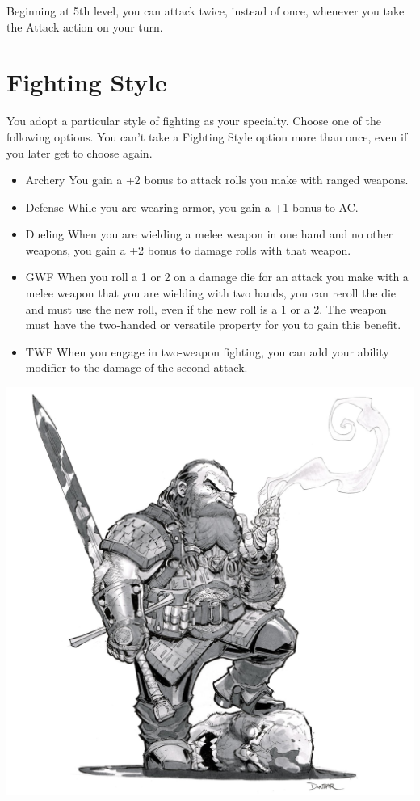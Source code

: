 \begin{multicols*}{2}
Beginning at 5th level, you can attack twice, instead of once, whenever you take the Attack action on your turn.


\section*{Fighting Style}

You adopt a particular style of fighting as your specialty. Choose one of the following options. You can’t take a Fighting Style option more than once, even if you later get to choose again.


\begin{itemize}
    \item Archery You gain a +2 bonus to attack rolls you make with ranged weapons.
    \item Defense While you are wearing armor, you gain a +1 bonus to AC. 
    \item Dueling When you are wielding a melee weapon in one hand and no other weapons, you gain a +2 bonus to damage rolls with that weapon.
    \item GWF When you roll a 1 or 2 on a damage die for an attack you make with a melee weapon that you are wielding with two hands, you can reroll the die and must use the new roll, even if the new roll is a 1 or a 2. The weapon must have the two-handed or versatile property for you to gain this benefit. 
    \item TWF When you engage in two-weapon fighting, you can add your ability modifier to the damage of the second attack.
\end{itemize}


\begin{Figure}
\centering
\includegraphics[width=\textwidth]{img/fighter-dwarf.png}
\end{Figure}
    


\end{multicols*}
